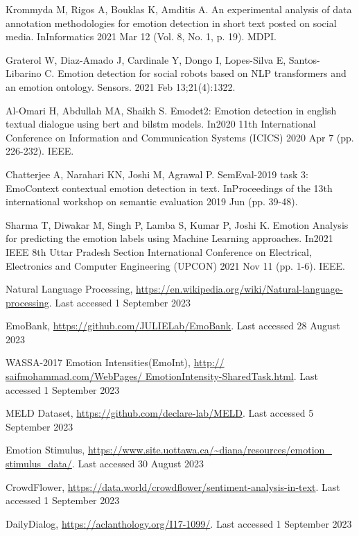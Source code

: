 \documentclass[runningheads]{llncs}
\begin{document}
\begin{thebibliography}{8}
Krommyda M, Rigos A, Bouklas K, Amditis A. An experimental analysis of data annotation methodologies for emotion detection in short text posted on social media. InInformatics 2021 Mar 12 (Vol. 8, No. 1, p. 19). MDPI.

Graterol W, Diaz-Amado J, Cardinale Y, Dongo I, Lopes-Silva E, Santos-Libarino C. Emotion detection for social robots based on NLP transformers and an emotion ontology. Sensors. 2021 Feb 13;21(4):1322.

Al-Omari H, Abdullah MA, Shaikh S. Emodet2: Emotion detection in english textual dialogue using bert and bilstm models. In2020 11th International Conference on Information and Communication Systems (ICICS) 2020 Apr 7 (pp. 226-232). IEEE.

Chatterjee A, Narahari KN, Joshi M, Agrawal P. SemEval-2019 task 3: EmoContext contextual emotion detection in text. InProceedings of the 13th international workshop on semantic evaluation 2019 Jun (pp. 39-48).

Sharma T, Diwakar M, Singh P, Lamba S, Kumar P, Joshi K. Emotion Analysis for predicting the emotion labels using Machine Learning approaches. In2021 IEEE 8th Uttar Pradesh Section International Conference on Electrical, Electronics and Computer Engineering (UPCON) 2021 Nov 11 (pp. 1-6). IEEE.




Natural Language Processing, \url{https://en.wikipedia.org/wiki/Natural-language-processing}. Last accessed 1 September 2023

EmoBank, \url{https://github.com/JULIELab/EmoBank}. Last accessed 28 August 2023

WASSA-2017 Emotion Intensities(EmoInt), \url{http://
saifmohammad.com/WebPages/
EmotionIntensity-SharedTask.html}.
Last accessed 1 September 2023

MELD Dataset, \url{https://github.com/declare-lab/MELD}. Last accessed 5 September 2023

Emotion Stimulus, \url{https://www.site.uottawa.ca/\~diana/resources/emotion\_
stimulus\_data/}. Last accessed 30 August 2023

CrowdFlower, \url{https://data.world/crowdflower/sentiment-analysis-in-text}.
Last accessed 1 September 2023

DailyDialog, \url{https://aclanthology.org/I17-1099/}. Last accessed 1 September 2023


\end{thebibliography}
\end{document}
